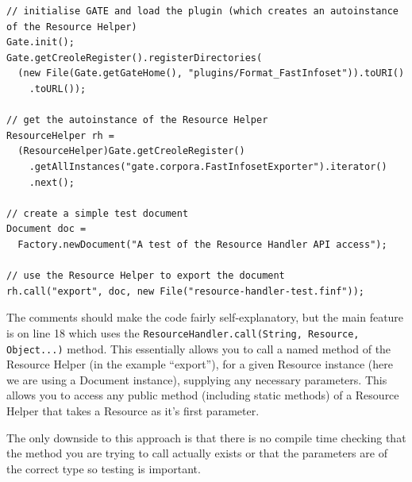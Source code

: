 \begin{lstlisting}
// initialise GATE and load the plugin (which creates an autoinstance of the Resource Helper)
Gate.init();
Gate.getCreoleRegister().registerDirectories(
  (new File(Gate.getGateHome(), "plugins/Format_FastInfoset")).toURI()
    .toURL());

// get the autoinstance of the Resource Helper
ResourceHelper rh =
  (ResourceHelper)Gate.getCreoleRegister()
    .getAllInstances("gate.corpora.FastInfosetExporter").iterator()
    .next();

// create a simple test document
Document doc =
  Factory.newDocument("A test of the Resource Handler API access");

// use the Resource Helper to export the document
rh.call("export", doc, new File("resource-handler-test.finf"));
\end{lstlisting}

The comments should make the code fairly self-explanatory, but the main feature
is on line 18 which uses the \lstinline!ResourceHandler.call(String, Resource, Object...)!
method. This essentially allows you to call a named method of the Resource Helper
(in the example ``export''), for a given Resource instance (here we are using a
Document instance), supplying any necessary parameters. This allows you to
access any public method (including static methods) of a Resource Helper that
takes a Resource as it's first parameter.

The only downside to this approach is that there is no compile time checking
that the method you are trying to call actually exists or that the parameters
are of the correct type so testing is important.
